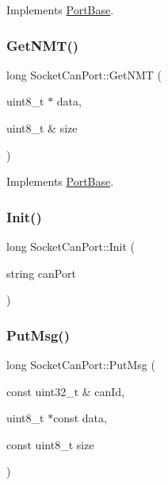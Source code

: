 Implements \hyperlink{classPortBase_a4fe82768f2b79889d7084292ac0e8696}{Port\+Base}.

\mbox{\label{classSocketCanPort_a2efe27bd3bb8c8127c89925e1e21535a}} 
\subsubsection{\texorpdfstring{Get\+N\+M\+T()}{GetNMT()}}
{\footnotesize\ttfamily long Socket\+Can\+Port\+::\+Get\+N\+MT (\begin{DoxyParamCaption}\item[{uint8\+\_\+t $\ast$}]{data,  }\item[{uint8\+\_\+t \&}]{size }\end{DoxyParamCaption})\hspace{0.3cm}{\ttfamily [virtual]}}



Implements \hyperlink{classPortBase_abab2bf17b01d87c2bca01cb2151aa2f1}{Port\+Base}.

\mbox{\label{classSocketCanPort_a9209d295c98c12ab85ec61773b775bf4}} 
\subsubsection{\texorpdfstring{Init()}{Init()}}
{\footnotesize\ttfamily long Socket\+Can\+Port\+::\+Init (\begin{DoxyParamCaption}\item[{string}]{can\+Port }\end{DoxyParamCaption})\hspace{0.3cm}{\ttfamily [private]}}

\mbox{\label{classSocketCanPort_a9375a0c1e33978c83ebd188100898633}} 
\subsubsection{\texorpdfstring{Put\+Msg()}{PutMsg()}}
{\footnotesize\ttfamily long Socket\+Can\+Port\+::\+Put\+Msg (\begin{DoxyParamCaption}\item[{const uint32\+\_\+t \&}]{can\+Id,  }\item[{uint8\+\_\+t $\ast$const}]{data,  }\item[{const uint8\+\_\+t}]{size }\end{DoxyParamCaption})\hspace{0.3cm}{\ttfamily [virtual]}}



